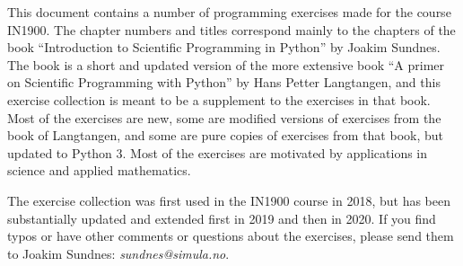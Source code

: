 This document contains a number of programming exercises made for the
course IN1900. The chapter numbers and titles correspond mainly to the chapters of
the book ``Introduction to Scientific Programming in Python'' by Joakim Sundnes.
The book is a short and updated version of the more extensive book
``A primer on Scientific Programming with Python'' by Hans Petter Langtangen,
and this exercise collection is meant to be a supplement to  the exercises in that book.
Most of the exercises are new, some are modified versions of exercises from the
book of Langtangen, and some are pure copies of exercises from that book, but updated to
Python 3. Most of the exercises are motivated by applications in
science and applied mathematics.

The exercise collection was first used in the
IN1900 course in 2018, but has been substantially updated and extended first in 2019
and then in 2020. If you find typos or have other comments or questions about the exercises,
please send them to Joakim Sundnes: \emph{sundnes@simula.no}.
